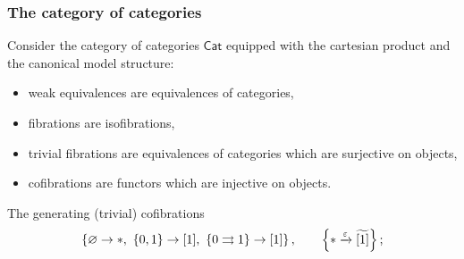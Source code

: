 \documentclass[a4paper,10pt
,draft
]{article}%
\numberwithin{equation}{section}
\numberwithin{figure}{section}
\theoremstyle{definition} %
\newcommand{\set}[1]{\left\{#1\right\}}%
\newcommand{\Cat}{\mathsf{Cat}}
\newcommand{\1}{\ensuremath{\mathbbm 1}}%
\begin{document}
\subsubsection*{The category of categories}

Consider the category of categories $\Cat$ equipped with the cartesian product and the canonical model structure:
\begin{itemize}
\item weak equivalences are equivalences of categories,
\item fibrations are isofibrations,
\item trivial fibrations are equivalences of categories which are surjective on objects,
\item cofibrations are functors which are injective on objects.
\end{itemize}

The generating (trivial) cofibrations
\[
      \set{ \varnothing \to \**,\ \set{0,1} \to [1],\ \set{0 \rightrightarrows 1} \to [1] },
      \qquad
      \set{ \** \xrightarrow{\varepsilon} \widetilde{[1]} };
\]
\end{document}
